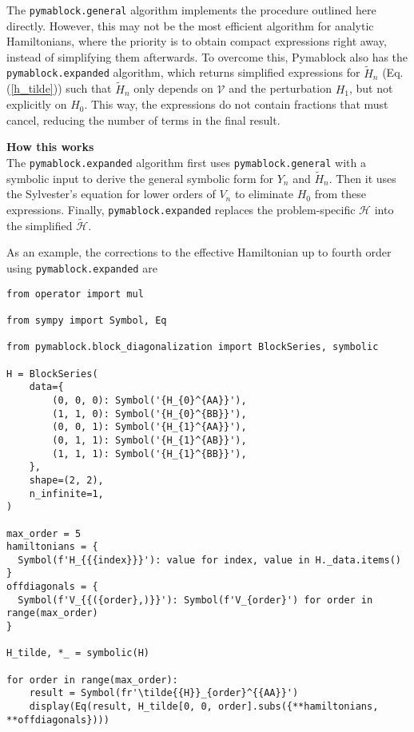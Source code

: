 The \texttt{pymablock.general} algorithm implements the procedure outlined here directly.
However, this may not be the most efficient algorithm for analytic Hamiltonians,
where the priority is to obtain compact expressions right away, instead of
simplifying them afterwards.
To overcome this, Pymablock also has the \texttt{pymablock.expanded} algorithm, which
returns simplified expressions for $\tilde{H}_{n}$ (Eq. (\ref{h_tilde})) such
that $\tilde{H}_{n}$ only depends on $\mathcal{V}$ and the perturbation $H_1$, but not
explicitly on $H_0$.
This way, the expressions do not contain fractions that must cancel, reducing
the number of terms in the final result.

\begin{framed}
\textbf{How this works}\\
The \texttt{pymablock.expanded} algorithm first uses
\texttt{pymablock.general} with a symbolic input to derive the general
symbolic form for $Y_n$ and $\tilde{H}_n$.
Then it uses the Sylvester's equation for lower orders of $V_n$ to eliminate
$H_0$ from these expressions.
Finally, \texttt{pymablock.expanded} replaces the problem-specific $\mathcal{H}$ into
the simplified $\tilde{\mathcal{H}}$.
\end{framed}

As an example, the corrections to the effective Hamiltonian up to fourth
order using \texttt{pymablock.expanded} are

\begin{verbatim}
from operator import mul

from sympy import Symbol, Eq

from pymablock.block_diagonalization import BlockSeries, symbolic

H = BlockSeries(
    data={
        (0, 0, 0): Symbol('{H_{0}^{AA}}'),
        (1, 1, 0): Symbol('{H_{0}^{BB}}'),
        (0, 0, 1): Symbol('{H_{1}^{AA}}'),
        (0, 1, 1): Symbol('{H_{1}^{AB}}'),
        (1, 1, 1): Symbol('{H_{1}^{BB}}'),
    },
    shape=(2, 2),
    n_infinite=1,
)

max_order = 5
hamiltonians = {
  Symbol(f'H_{{{index}}}'): value for index, value in H._data.items()
}
offdiagonals = {
  Symbol(f'V_{{({order},)}}'): Symbol(f'V_{order}') for order in range(max_order)
}

H_tilde, *_ = symbolic(H)

for order in range(max_order):
    result = Symbol(fr'\tilde{{H}}_{order}^{{AA}}')
    display(Eq(result, H_tilde[0, 0, order].subs({**hamiltonians, **offdiagonals})))
\end{verbatim}

